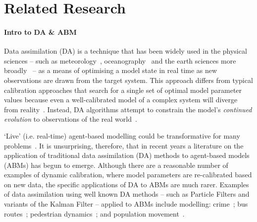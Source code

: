 \section{Related Research}\label{sec:background}

\paragraph{Intro to DA \& ABM}

Data assimilation (DA) is a technique that has been widely used in the physical sciences -- such as meteorology~\cite{kalnay_atmospheric_2003}, oceanography~\cite{bertino_sequential_2003} and the earth sciences more broadly~\cite{reichle_data_2008} -- as a means of optimising a model state in real time as new observations are drawn from the target system. This approach differs from typical calibration approaches that search for a single set of optimal model parameter values because even a well-calibrated model of a complex system will diverge from reality~\cite{ward_dynamic_2016}. Instead, DA algorithms attempt to constrain the model's \textit{continued evolution} to observations of the real world~\cite{evans_uncertainty_2012}. 

`Live' (i.e. real-time) agent-based modelling could be transformative for many problems~\cite{swarup_live_2020}. It is unsurprising, therefore, that in recent years a literature on the application of traditional data assimilation (DA) methods to agent-based models (ABMs) has begun to emerge. Although there are a reasonable number of examples of dynamic calibration, where model parameters are re-calibrated based on new data, the specific applications of DA to ABMs are much rarer. Examples of data assimilation using well known DA methods -- such as Particle Filters and variants of the Kalman Filter -- applied to ABMs include modelling:
crime~\cite{lloyd_exploring_2016};
bus routes~\cite{kieu_dealing_2020};
pedestrian dynamics~\cite{wang_data_2015, ward_dynamic_2016, clay_realtime_2020, malleson_simulating_2020};
and population movement~\cite{lueck_who_2019}. 

